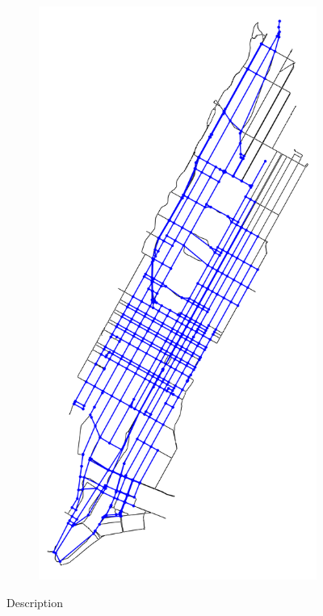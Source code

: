\begin{figure}[tbh]
\begin{subfigure}[b]{0.32\textwidth}
		\caption{}
		\label{fig:nyc_simplified_info}
	\end{subfigure}
	\begin{subfigure}[b]{0.32\textwidth}
		\centering
		\includegraphics[width=\textwidth]{assets/img/new_york_simplified_roads.png}
		\caption{}
		\label{fig:nyc_simplified_roads}
	\end{subfigure}
	
	\caption[Title In the TOC]{Description }
	\label{fig:nyc_rn}
\end{figure}











